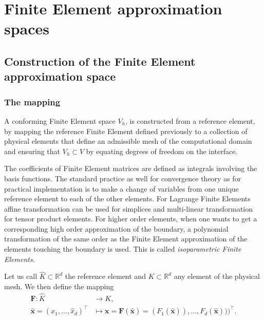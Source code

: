 \chapter{Finite Element approximation spaces}
\section{Construction of the Finite Element approximation space}

\subsection{The mapping}

A conforming Finite Element space $V_h$, is constructed from a reference element, by mapping the reference Finite Element defined previously to a collection of physical elements that define an admissible mesh of the computational domain and ensuring   that $V_h\subset V$ by equating degrees of freedom on the interface.  

The coefficients of Finite Element matrices are defined as integrals involving the basis functions. The standard practice as well for convergence theory as for practical implementation is to  make a change of variables from one unique reference element to each of the other elements.
For Lagrange Finite Elements affine transformation can be used for simplices and multi-linear transformation for tensor product elements. For higher order elements, when one wants to get a corresponding high order approximation of the boundary, a polynomial transformation of the same order as the Finite Element approximation of the elements touching the boundary is used. This is called \emph{isoparametric Finite Elements}.

Let us call $\hat{K}\subset \mathbb{R}^d$ the reference element and $K\subset \mathbb{R}^d$ any element of the physical mesh. We then define the mapping
\begin{align*}
\mathbf{F}: \hat{K} &\rightarrow K,\\
\hat{ \mathbf{x}}=(\hat{x}_1, \dots, \hat{x}_d)^\top &\mapsto \mathbf{x}= \mathbf{F}(\hat{ \mathbf{x}})=(F_1( \hat{ \mathbf{x}})), \dots, F_d( \hat{ \mathbf{x}})))^\top .
\end{align*}



